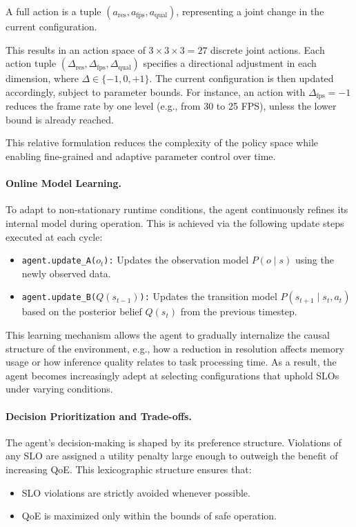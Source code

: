 A full action is a tuple $(a_\text{res}, a_\text{fps}, a_\text{qual})$, representing a joint change in the current configuration.


This results in an action space of $3 \times 3 \times 3 = 27$ discrete joint actions. Each action tuple $(\Delta_\text{res}, \Delta_\text{fps}, \Delta_\text{qual})$ specifies a directional adjustment in each dimension, where \(\Delta \in \{-1, 0, +1\}\). The current configuration is then updated accordingly, subject to parameter bounds. For instance, an action with \(\Delta_\text{fps} = -1\) reduces the frame rate by one level (e.g., from 30 to 25 FPS), unless the lower bound is already reached.

This relative formulation reduces the complexity of the policy space while enabling fine-grained and adaptive parameter control over time.

\paragraph{Online Model Learning.}
To adapt to non-stationary runtime conditions, the agent continuously refines its internal model during operation. This is achieved via the following update steps executed at each cycle:

\begin{itemize}
  \item \texttt{agent.update\_A(\(o_t\)):} Updates the observation model \( P(o \mid s) \) using the newly observed data.
  \item \texttt{agent.update\_B(\(Q(s_{t-1})\)):} Updates the transition model \( P(s_{t+1} \mid s_t, a_t) \) based on the posterior belief \(Q(s_{t})\) from the previous timestep.
\end{itemize}

This learning mechanism allows the agent to gradually internalize the causal structure of the environment, e.g., how a reduction in resolution affects memory usage or how inference quality relates to task processing time. As a result, the agent becomes increasingly adept at selecting configurations that uphold SLOs under varying conditions.

\paragraph{Decision Prioritization and Trade-offs.}
The agent’s decision-making is shaped by its preference structure. Violations of any SLO are assigned a utility penalty large enough to outweigh the benefit of increasing QoE. This lexicographic structure ensures that:
\begin{itemize}
  \item SLO violations are strictly avoided whenever possible.
  \item QoE is maximized only within the bounds of safe operation.
\end{itemize}

